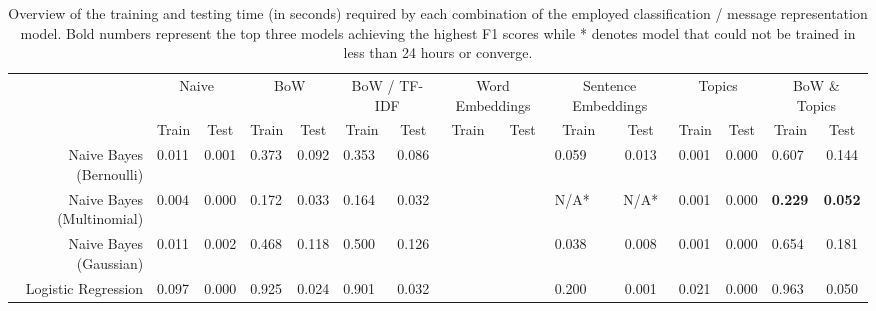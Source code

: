 \documentclass[letterpaper]{article}
\begin{document}
\begin{landscape}
	\begin{table}[t!]
		\centering
		\caption{Overview of the training and testing time (in seconds) required by each combination of the employed classification / message representation model. Bold numbers represent the top three models achieving the highest F1 scores while * denotes model that could not be trained in less than 24 hours or converge.}
		\label{tb: time}
		\begin{tabular}{@{}r|lclclclclclclc@{}}
			\toprule
			                          & \multicolumn{2}{c}{Naive}         & \multicolumn{2}{c}{BoW}           & \multicolumn{2}{c}{BoW / TF-IDF}  & \multicolumn{2}{c}{Word Embeddings} & \multicolumn{2}{c}{Sentence Embeddings} & \multicolumn{2}{c}{Topics}             & \multicolumn{2}{c}{BoW \& Topics}            \\
			\multicolumn{1}{l|}{}     & \multicolumn{1}{c}{Train} & Test  & \multicolumn{1}{c}{Train} & Test  & \multicolumn{1}{c}{Train} & Test  & \multicolumn{1}{c}{Train} & Test    & \multicolumn{1}{c}{Train}     & Test    & \multicolumn{1}{c}{Train}    & Test    & \multicolumn{1}{c}{Train}    & Test          \\ \midrule
			Naive Bayes (Bernoulli)   & 0.011                     & 0.001 & 0.373                     & 0.092 & 0.353                     & 0.086 &                           &         & 0.059                         & 0.013   & 0.001                        & 0.000   & 0.607                        & 0.144         \\
			Naive Bayes (Multinomial) & 0.004                     & 0.000 & 0.172                     & 0.033 & 0.164                     & 0.032 &                           &         & N/A*                          &  N/A*   & 0.001                        & 0.000   & \textbf{0.229}               & \textbf{0.052}\\
			Naive Bayes (Gaussian)    & 0.011                     & 0.002 & 0.468                     & 0.118 & 0.500                     & 0.126 &                           &         & 0.038                         & 0.008   & 0.001                        & 0.000   & 0.654                        & 0.181         \\
			Logistic Regression       & 0.097                     & 0.000 & 0.925                     & 0.024 & 0.901                     & 0.032 &                           &         & 0.200                         & 0.001   & 0.021                        & 0.000   & 0.963                        & 0.050         \\

\end{tabular}
\end{table}
\end{landscape}
\end{document}
